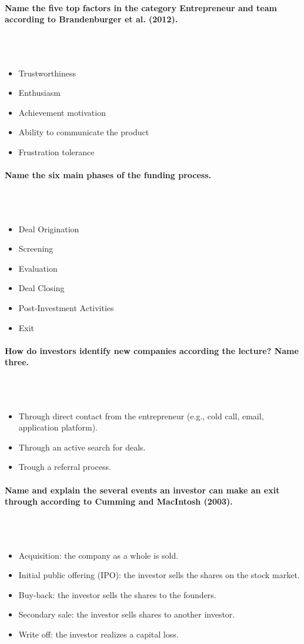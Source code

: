 \documentclass[10pt,a4paper,noendnumber=true]{scrartcl}
\newcommand{\properparagraph}[1]{\paragraph{\textcolor{Emerald}{#1}}\mbox{}\\}
\begin{document}
\properparagraph{Name the five top factors in the category Entrepreneur and team according to Brandenburger et al. (2012).}
\\[-6ex]
\begin{itemize}
	\item Trustworthiness
	\item Enthusiasm
	\item Achievement motivation
	\item Ability to communicate the product
	\item Frustration tolerance
\end{itemize}

\properparagraph{Name the six main phases of the funding process.}
\\[-6ex]
\begin{itemize}
	\item Deal Origination
	\item Screening
	\item Evaluation
	\item Deal Closing
	\item Post-Investment Activities
	\item Exit
\end{itemize}


\properparagraph{How do investors identify new companies according the lecture? Name three.}
\\[-6ex]
\begin{itemize}
	\item Through direct contact from the entrepreneur (e.g., cold call, email, application platform).
	\item Through an active search for deals.
	\item Trough a referral process.
\end{itemize}

\properparagraph{Name and explain the several events an investor can make an exit through according to Cumming and MacIntosh (2003).}
\\[-6ex]
\begin{itemize}
	\item Acquisition: the company as a whole is sold.
	\item Initial public offering (IPO): the investor sells the
	shares on the stock market.
	\item Buy-back: the investor sells the shares to the
	founders.
	\item Secondary sale: the investor sells shares to
	another investor.
	\item Write off: the investor realizes a capital loss.
\end{itemize}
\end{document}

